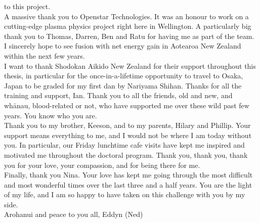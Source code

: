 \documentclass[
  a4paper,
]{scrbook}
\renewcommand*\contentsname{Table of contents}
\newcommand\contentsname{Table of contents}
\begin{document}
to this project. \\[5pt] A massive thank you to Openstar Technologies. It was an honour to work on a cutting-edge plasma physics project right here in Wellington. A particularly big thank you to Thomas, Darren, Ben and Ratu for having me as part of the team. I sincerely hope to see fusion with net energy gain in Aotearoa New Zealand within the next few years. \\[5pt] I want to thank Shodokan Aikido New Zealand for their support throughout this thesis, in particular for the once-in-a-lifetime opportunity to travel to Osaka, Japan to be graded for my first dan by Nariyama Shihan. Thanks for all the training and support, Ian. Thank you to all the friends, old and new, and whānau, blood-related or not, who have supported me over these wild past few years. You know who you are. \\[5pt] Thank you to my brother, Keeson, and to my parents, Hilary and Phillip. Your support means everything to me, and I would not be where I am today without you. In particular, our Friday lunchtime cafe visits have kept me inspired and motivated me throughout the doctoral program. Thank you, thank you, thank you for your love, your compassion, and for being there for me. \\[5pt] Finally, thank you Nina. Your love has kept me going through the most difficult and most wonderful times over the last three and a half years. You are the light of my life, and I am so happy to have taken on this challenge with you by my side. \\[5pt] Arohanui and peace to you all, Eddyn (Ned)

\clearpage
\newpage
\thispagestyle{empty} %
\mbox{~}
\clearpage
\newpage

\pagestyle{headings}

\ifdefined\Shaded\renewenvironment{Shaded}{\begin{tcolorbox}[interior hidden, frame hidden, boxrule=0pt, breakable, enhanced, sharp corners, borderline west={3pt}{0pt}{shadecolor}]}{\end{tcolorbox}}\fi

\renewcommand*\contentsname{Table of Contents}
{
\setcounter{tocdepth}{2}
\tableofcontents
}
\listoffigures
{}
\listoftables
{}

\clearpage
\newpage
\thispagestyle{empty} %
\mbox{~}
\clearpage
\newpage
\end{document}
